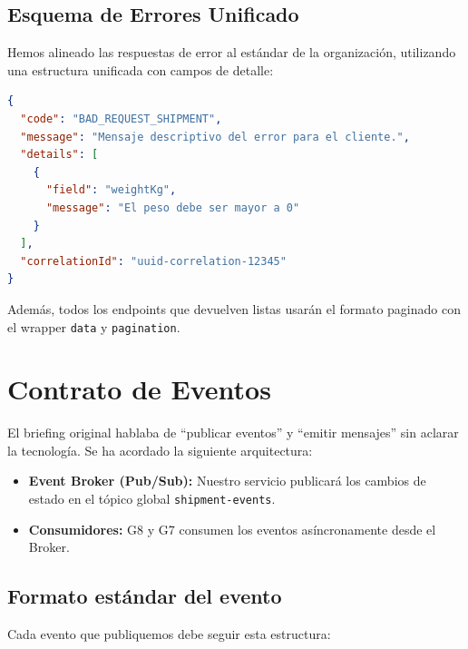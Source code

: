 \documentclass[11pt, a4paper]{article}
\begin{document}
\subsection{Esquema de Errores Unificado}

Hemos alineado las respuestas de error al estándar de la organización, utilizando
una estructura unificada con campos de detalle:

\begin{lstlisting}[language=json]
{
  "code": "BAD_REQUEST_SHIPMENT",
  "message": "Mensaje descriptivo del error para el cliente.",
  "details": [
    {
      "field": "weightKg",
      "message": "El peso debe ser mayor a 0"
    }
  ],
  "correlationId": "uuid-correlation-12345"
}
\end{lstlisting}

Además, todos los endpoints que devuelven listas usarán el formato paginado con el wrapper \texttt{data} y \texttt{pagination}.


\section{Contrato de Eventos}
\label{sec:eventos}

\begin{alertbox}[title={\faExclamationTriangle\quad Corrección: Mecanismo de eventos}]
  El briefing original hablaba de ``publicar eventos'' y ``emitir mensajes''
  sin aclarar la tecnología. Se ha acordado la siguiente arquitectura:
  \begin{itemize}[noitemsep]
    \item \textbf{Event Broker (Pub/Sub):} Nuestro servicio publicará los cambios de estado
          en el tópico global \texttt{shipment-events}.
    \item \textbf{Consumidores:} G8 y G7 consumen los eventos asíncronamente desde el Broker.
  \end{itemize}
\end{alertbox}

\subsection{Formato estándar del evento}

Cada evento que publiquemos debe seguir esta estructura:
\end{document}
